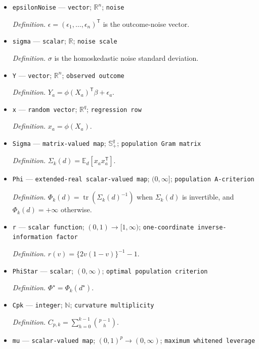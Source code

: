 \documentclass{article}
\begin{document}
\begin{itemize}
  \item \texttt{epsilonNoise} --- \texttt{vector}; \(\mathbb R^n\); \texttt{noise}
  \par\smallskip\noindent\emph{Definition.} \(\epsilon=(\epsilon_1,\ldots,\epsilon_n)^{\mathsf T}\) is the outcome-noise vector.
  \item \texttt{sigma} --- \texttt{scalar}; \(\mathbb R\); \texttt{noise scale}
  \par\smallskip\noindent\emph{Definition.} \(\sigma\) is the homoskedastic noise standard deviation.
  \item \texttt{Y} --- \texttt{vector}; \(\mathbb R^n\); \texttt{observed outcome}
  \par\smallskip\noindent\emph{Definition.} \(Y_a=\phi(X_a)^{\mathsf T}\beta+\epsilon_a\).
  \item \texttt{x} --- \texttt{random vector}; \(\mathbb R^q\); \texttt{regression row}
  \par\smallskip\noindent\emph{Definition.} \(x_a=\phi(X_a)\).
  \item \texttt{Sigma} --- \texttt{matrix-\allowbreak{}valued map}; \(\mathbb S_{+}^q\); \texttt{population Gram matrix}
  \par\smallskip\noindent\emph{Definition.} \(\Sigma_k(d)=\mathbb E_d[x_ax_a^{\mathsf T}]\).
  \item \texttt{Phi} --- \texttt{extended-\allowbreak{}real scalar-\allowbreak{}valued map}; \((0,\infty]\); \texttt{population A-\allowbreak{}criterion}
  \par\smallskip\noindent\emph{Definition.} \(\Phi_k(d)=\operatorname{tr}(\Sigma_k(d)^{-1})\) when \(\Sigma_k(d)\) is invertible, and \(\Phi_k(d)=+\infty\) otherwise.
  \item \texttt{r} --- \texttt{scalar function}; \((0,1)\to[1,\infty)\); \texttt{one-\allowbreak{}coordinate inverse-\allowbreak{}information factor}
  \par\smallskip\noindent\emph{Definition.} \(r(v)=\{2v(1-v)\}^{-1}-1\).
  \item \texttt{PhiStar} --- \texttt{scalar}; \((0,\infty)\); \texttt{optimal population criterion}
  \par\smallskip\noindent\emph{Definition.} \(\Phi^\star=\Phi_k(d^\star)\).
  \item \texttt{Cpk} --- \texttt{integer}; \(\mathbb N\); \texttt{curvature multiplicity}
  \par\smallskip\noindent\emph{Definition.} \(C_{p,k}=\sum_{h=0}^{k-1}\binom{p-1}{h}\).
  \item \texttt{mu} --- \texttt{scalar-\allowbreak{}valued map}; \((0,1)^p\to(0,\infty)\); \texttt{maximum whitened leverage}

\end{itemize}
\end{document}
